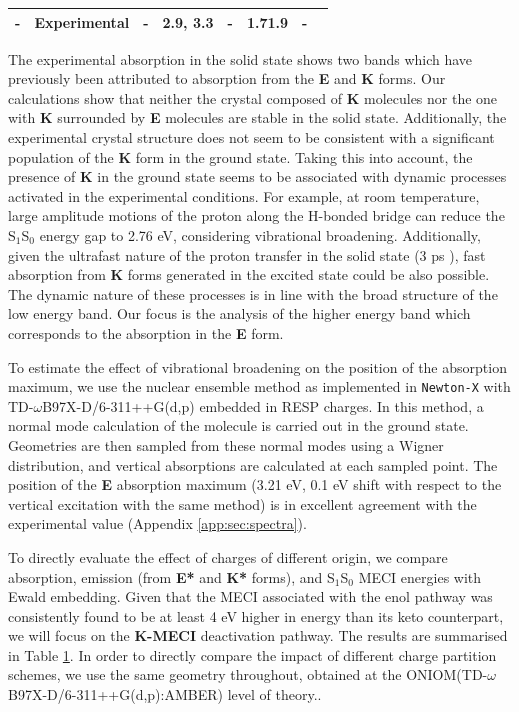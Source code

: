 \begin{table}
{\begin{tabular}{@{}>{\centering\arraybackslash}m{3cm}ccccccc@{}}
-&Experimental\cite{Zhang2015,Zahid2017} & - &2.9, 3.3 & - &1.7\textendash{}1.9 & -\-\\\bottomrule
\end{tabular}
  }
\label{tab:point_energies}
\end{table}

The experimental absorption in the solid state shows two bands which have previously been attributed to absorption from the \textbf{E} and \textbf{K} forms.\cite{Zhang2015,Zahid2017}  Our calculations show that neither the crystal composed of \textbf{K} molecules nor the one with \textbf{K} surrounded by \textbf{E} molecules are stable in the solid state. Additionally, the experimental crystal structure does not seem to be consistent with a significant population of the \textbf{K} form in the ground state.\cite{Zahid2017} Taking this into account, the presence of \textbf{K} in the ground state seems to be associated with dynamic processes activated in the experimental conditions. For example, at room temperature, large amplitude motions of the proton along the H-bonded bridge can reduce the S$_1$\textendash{}S$_0$ energy gap to 2.76 eV, considering vibrational broadening. Additionally, given the ultrafast nature of the proton transfer in the solid state (3 ps \cite{Zahid2017}), fast absorption from \textbf{K} forms generated in the excited state could be also possible. The dynamic nature of these processes is in line with the broad structure of the low energy band. Our focus is the analysis of the higher energy band which corresponds to the absorption in the \textbf{E} form.

To estimate the effect of vibrational broadening on the position of the absorption maximum, we use the nuclear ensemble method\cite{Crespo-Otero2012a} as implemented in \texttt{Newton-X}\cite{newtonx} with TD-$\omega$B97X-D/6-311++G(d,p) embedded in RESP charges. In this method, a normal mode calculation of the molecule is carried out in the ground state. Geometries are then sampled from these normal modes using a Wigner distribution, and vertical absorptions are calculated at each sampled point. The position of the \textbf{E} absorption maximum (3.21 eV, 0.1 eV shift with respect to the vertical excitation with the same method) is in excellent agreement with the experimental value (Appendix \ref{app:sec:spectra}). 

To directly evaluate the effect of charges of different origin, we compare absorption, emission (from \textbf{E*} and \textbf{K*} forms), and S$_1$\textendash{}S$_0$ MECI energies with Ewald embedding. Given that the MECI associated with the enol pathway was consistently found to be at least 4 eV higher in energy than its keto counterpart, we will focus on the \textbf{K-MECI} deactivation pathway. The results are summarised in Table \ref{tab:point_energies}. In order to directly compare the impact of different charge partition schemes, we use the same geometry throughout, obtained at the ONIOM(TD-$\omega$B97X-D/6-311++G(d,p):AMBER) level of theory.\cite{Dommett2017c}. 


